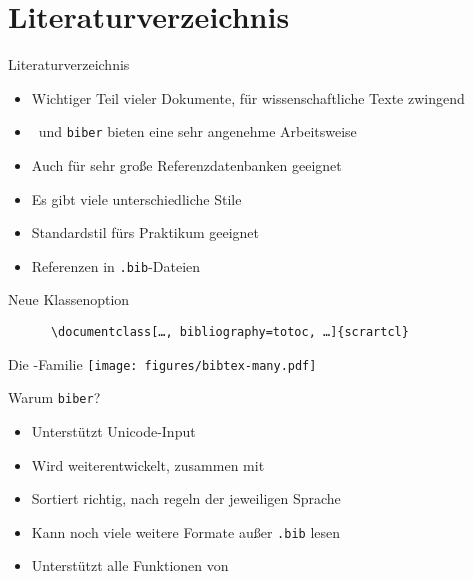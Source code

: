 \section{Literaturverzeichnis}

\begin{frame}[fragile]{Literaturverzeichnis}
  \begin{itemize}
    \item Wichtiger Teil vieler Dokumente, für wissenschaftliche Texte zwingend
    \item \BibLaTeX\ und \texttt{biber} bieten eine sehr angenehme Arbeitsweise
    \item Auch für sehr große Referenzdatenbanken geeignet
    \item Es gibt viele unterschiedliche Stile
    \item Standardstil fürs Praktikum geeignet
    \item Referenzen in \texttt{.bib}-Dateien
  \end{itemize}
  \begin{block}{Neue Klassenoption}
    \begin{lstlisting}
      \documentclass[…, bibliography=totoc, …]{scrartcl}
    \end{lstlisting}
  \end{block}
\end{frame}

\begin{frame}{Die \BibTeX-Familie}
  \centering
  \vspace{0.025\textheight}
  \texttt{[image: figures/bibtex-many.pdf]}
\end{frame}

\begin{frame}{Warum \texttt{biber}?}
  \begin{itemize}
    \item Unterstützt Unicode-Input
    \item Wird weiterentwickelt, zusammen mit \BibLaTeX
    \item Sortiert richtig, nach regeln der jeweiligen Sprache
    \item Kann noch viele weitere Formate außer \texttt{.bib} lesen
    \item Unterstützt alle Funktionen von \BibLaTeX
  \end{itemize}
\end{frame}


